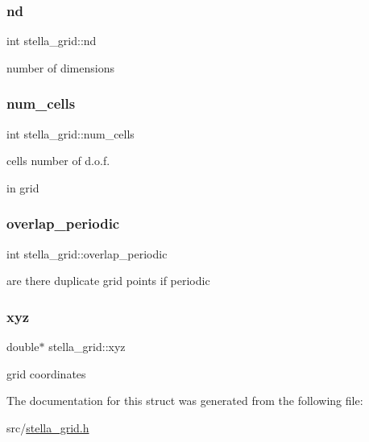 \subsubsection{\texorpdfstring{nd}{nd}}
{\footnotesize\ttfamily int stella\+\_\+grid\+::nd}



number of dimensions 

\mbox{\label{structstella__grid_afd6a2ee54de531c805cc15b644491d9f}} 
\subsubsection{\texorpdfstring{num\+\_\+cells}{num\_cells}}
{\footnotesize\ttfamily int stella\+\_\+grid\+::num\+\_\+cells}



cells number of d.\+o.\+f. 

in grid \mbox{\label{structstella__grid_ab8330b0c4c1613de977e5debdb94eff0}} 
\subsubsection{\texorpdfstring{overlap\+\_\+periodic}{overlap\_periodic}}
{\footnotesize\ttfamily int stella\+\_\+grid\+::overlap\+\_\+periodic}



are there duplicate grid points if periodic 

\mbox{\label{structstella__grid_a26cdb92edaa442067ef07100540086db}} 
\subsubsection{\texorpdfstring{xyz}{xyz}}
{\footnotesize\ttfamily double$\ast$ stella\+\_\+grid\+::xyz}



grid coordinates 



The documentation for this struct was generated from the following file\+:\begin{DoxyCompactItemize}
\item 
src/\mbox{\hyperlink{stella__grid_8h}{stella\+\_\+grid.\+h}}\end{DoxyCompactItemize}
